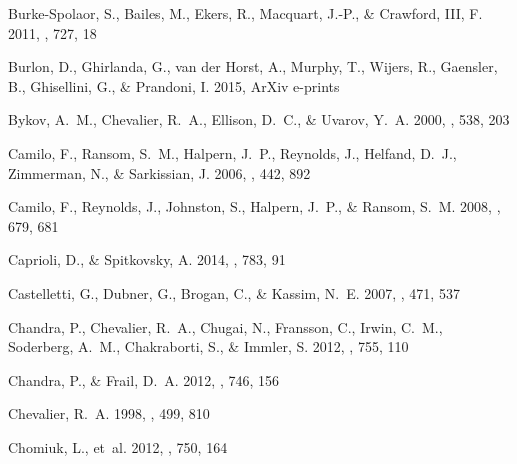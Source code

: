 \begin{thebibliography}{99}
\begin{multicols}{2}
{
{Burke-Spolaor}, S., {Bailes}, M., {Ekers}, R., {Macquart}, J.-P., \&
  {Crawford}, III, F. 2011, \apj, 727, 18

{Burlon}, D., {Ghirlanda}, G., {van der Horst}, A., {Murphy}, T., {Wijers}, R.,
  {Gaensler}, B., {Ghisellini}, G., \& {Prandoni}, I. 2015, ArXiv e-prints

{Bykov}, A.~M., {Chevalier}, R.~A., {Ellison}, D.~C., \& {Uvarov}, Y.~A. 2000,
  \apj, 538, 203

{Camilo}, F., {Ransom}, S.~M., {Halpern}, J.~P., {Reynolds}, J., {Helfand},
  D.~J., {Zimmerman}, N., \& {Sarkissian}, J. 2006, \nat, 442, 892

{Camilo}, F., {Reynolds}, J., {Johnston}, S., {Halpern}, J.~P., \& {Ransom},
  S.~M. 2008, \apj, 679, 681

{Caprioli}, D., \& {Spitkovsky}, A. 2014, \apj, 783, 91

{Castelletti}, G., {Dubner}, G., {Brogan}, C., \& {Kassim}, N.~E. 2007, \aap,
  471, 537

{Chandra}, P., {Chevalier}, R.~A., {Chugai}, N., {Fransson}, C., {Irwin},
  C.~M., {Soderberg}, A.~M., {Chakraborti}, S., \& {Immler}, S. 2012, \apj,
  755, 110

{Chandra}, P., \& {Frail}, D.~A. 2012, \apj, 746, 156

{Chevalier}, R.~A. 1998, \apj, 499, 810

{Chomiuk}, L., {et~al.} 2012, \apj, 750, 164

}
\end{multicols}
\end{thebibliography}
